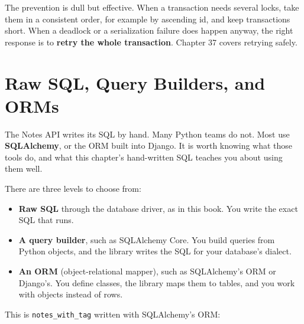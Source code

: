 The prevention is dull but effective. When a transaction needs several locks, take them in a consistent order, for example by ascending id, and keep transactions short. When a deadlock or a serialization failure does happen anyway, the right response is to \textbf{retry the whole transaction}. Chapter 37 covers retrying safely.

\setcounter{section}{13}
\section{Raw SQL, Query Builders, and ORMs}\label{33-logic-execution:3314-raw-sql-query-builders-and-orms}

The Notes API writes its SQL by hand. Many Python teams do not. Most use \textbf{SQLAlchemy}, or the ORM built into Django. It is worth knowing what those tools do, and what this chapter's hand-written SQL teaches you about using them well.

There are three levels to choose from:

\begin{itemize}
\tightlist
\item
  \textbf{Raw SQL} through the database driver, as in this book. You write the exact SQL that runs.
\item
  \textbf{A query builder}, such as SQLAlchemy Core. You build queries from Python objects, and the library writes the SQL for your database's dialect.
\item
  \textbf{An ORM} (object-relational mapper), such as SQLAlchemy's ORM or Django's. You define classes, the library maps them to tables, and you work with objects instead of rows.
\end{itemize}

\noindent{}This is \texttt{notes\_with\_tag} written with SQLAlchemy's ORM:

